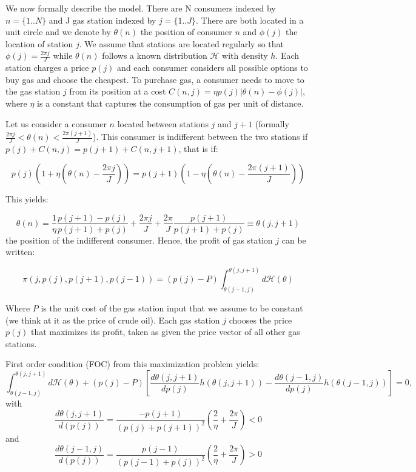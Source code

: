 \documentclass[10pt]{article}
\begin{document}
We now formally describe the model. There are N consumers indexed by $n=\{1..N\}$ and J gas station indexed by $j=\{1..J\}$. There are both located in a unit circle and we denote by $\theta(n)$ the position of consumer $n$ and $\phi(j)$ the location of station $j$. We assume that stations are located regularly so that $\phi(j) = \frac{2\pi j }{J}$ while $\theta(n)$ follows a known distribution $\mathcal{H}$ with density $h$.
Each station charges a price $p(j)$ and each consumer considers all possible options to buy gas and choose the cheapest. To purchase gas, a consumer needs to move to the gas station $j$ from its position at a cost $C(n,j) = \eta p(j) \left|\theta(n)-\phi(j) \right|$, where $\eta$ is a constant that captures the consumption of gas per unit of distance.

Let us consider a consumer $n$ located between stations $j$ and $j+1$ (formally $\frac{2\pi j }{J}<\theta(n)<\frac{2\pi (j+1) }{J}$). This consumer is indifferent between the two stations if $p(j)+C(n,j)=p(j+1)+C(n,j+1)$, that is if:

$$
p(j)\left(1+\eta\left(\theta(n)  -  \frac{2\pi j }{J}\right)\right) = p(j+1)\left(1-\eta\left(\theta(n)  -  \frac{2\pi (j+1) }{J}\right)\right)
$$

This yields:

$$
\theta(n) = \frac{1}{\eta}\frac{p(j+1)-p(j)}{p(j+1)+p(j)} + \frac{2\pi j}{J}+\frac{2\pi}{J}\frac{p(j+1)}{p(j+1)+p(j)} \equiv \theta(j, j+1)
$$
the position of the indifferent consumer. Hence, the profit of gas station $j$ can be written:

$$
\pi(j, p(j), p(j+1), p(j-1)) = \left(p(j)-P\right) \int_{\theta(j-1, j)}^{\theta(j, j+1)}{ d\mathcal{H}(\theta)}
$$

Where $P$ is the unit cost of the gas station input that we assume to be constant (we think at it as the price of crude oil). Each gas station $j$ chooses the price $p(j)$ that maximizes its profit, taken as given the price vector of all other gas stations.

First order condition (FOC) from this maximization problem yields:
$$
\int_{\theta(j-1, j)}^{\theta(j, j+1)}{ d\mathcal{H}(\theta)}+(p(j)-P)\left[\frac{d\theta(j,j+1)}{dp(j)}h(\theta(j,j+1)) - \frac{d\theta(j-1,j)}{dp(j)}h(\theta(j-1,j))\right] = 0,
$$
with 
$$\frac{d\theta(j,j+1)}{d(p(j))}=\frac{-p(j+1)}{\left(p(j)+p(j+1)\right)^2} \left(\frac{2}{\eta}+\frac{2\pi}{J} \right)<0$$
and
$$\frac{d\theta(j-1,j)}{d(p(j))}=\frac{p(j-1)}{\left(p(j-1)+p(j)\right)^2}\left(\frac{2}{\eta} +\frac{2\pi}{J}\right) > 0$$
\end{document}
